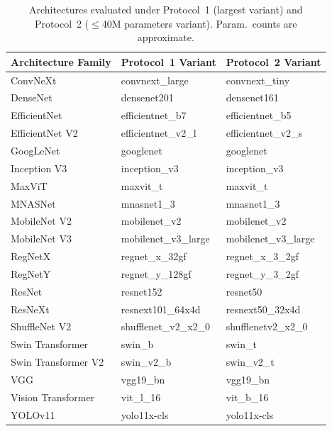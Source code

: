 \documentclass[review,12pt]{elsarticle}
\begin{document}
\begin{table}[htbp]
\centering
\caption{Architectures evaluated under Protocol~1 (largest variant) and
Protocol~2 ($\leq$40M parameters variant). Param.\ counts are approximate.}
\label{tab:models}
\small
\begin{tabular}{lll}
\toprule
\textbf{Architecture Family} &
\textbf{Protocol~1 Variant} &
\textbf{Protocol~2 Variant} \\
\midrule
ConvNeXt          & convnext\_large      & convnext\_tiny \\
DenseNet          & densenet201          & densenet161 \\
EfficientNet      & efficientnet\_b7     & efficientnet\_b5 \\
EfficientNet V2   & efficientnet\_v2\_l  & efficientnet\_v2\_s \\
GoogLeNet         & googlenet            & googlenet \\
Inception V3      & inception\_v3        & inception\_v3 \\
MaxViT            & maxvit\_t            & maxvit\_t \\
MNASNet           & mnasnet1\_3          & mnasnet1\_3 \\
MobileNet V2      & mobilenet\_v2        & mobilenet\_v2 \\
MobileNet V3      & mobilenet\_v3\_large & mobilenet\_v3\_large \\
RegNetX           & regnet\_x\_32gf      & regnet\_x\_3\_2gf \\
RegNetY           & regnet\_y\_128gf     & regnet\_y\_3\_2gf \\
ResNet            & resnet152            & resnet50 \\
ResNeXt           & resnext101\_64x4d    & resnext50\_32x4d \\
ShuffleNet V2     & shufflenet\_v2\_x2\_0 & shufflenetv2\_x2\_0 \\
Swin Transformer  & swin\_b              & swin\_t \\
Swin Transformer V2 & swin\_v2\_b        & swin\_v2\_t \\
VGG               & vgg19\_bn            & vgg19\_bn \\
Vision Transformer & vit\_l\_16          & vit\_b\_16 \\
YOLOv11           & yolo11x-cls          & yolo11x-cls \\
\bottomrule
\end{tabular}
\end{table}
\end{document}
